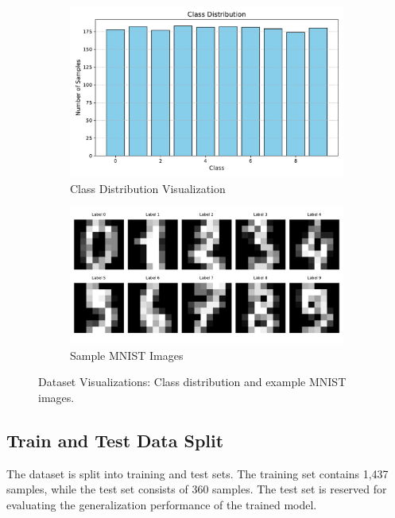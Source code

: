 \documentclass{article}
\begin{document}
\begin{figure}[h]
    \centering
    \begin{subfigure}[b]{0.45\textwidth}
        \includegraphics[width=\textwidth]{images/class_distribution.pdf}
        \caption{Class Distribution Visualization}
        \label{fig:class_distribution}
    \end{subfigure}
    \hfill
    \begin{subfigure}[b]{0.45\textwidth}
        \includegraphics[width=\textwidth]{images/MNIST_samples.pdf}
        \caption{Sample MNIST Images}
        \label{fig:mnist_samples}
    \end{subfigure}
    \caption{Dataset Visualizations: Class distribution and example MNIST images.}
    \label{fig:dataset_visualizations}
\end{figure}

\subsection{Train and Test Data Split}
The dataset is split into training and test sets. The training set contains 1,437 samples, while the test set consists of 360 samples. 
The test set is reserved for evaluating the generalization performance of the trained model.
\end{document}
